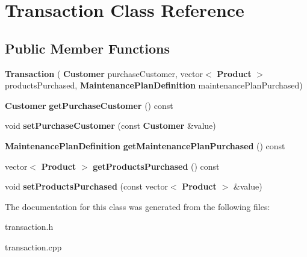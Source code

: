 \section{Transaction Class Reference}
\label{class_transaction}
\subsection*{Public Member Functions}
\begin{DoxyCompactItemize}
\item 
\mbox{\label{class_transaction_a784f940554eb84af1da458e68614224e}} 
{\bfseries Transaction} (\textbf{ Customer} purchase\+Customer, vector$<$ \textbf{ Product} $>$ products\+Purchased, \textbf{ Maintenance\+Plan\+Definition} maintenance\+Plan\+Purchased)
\item 
\mbox{\label{class_transaction_a27fd0df5b0261d28fc5ddeea719734ef}} 
\textbf{ Customer} {\bfseries get\+Purchase\+Customer} () const
\item 
\mbox{\label{class_transaction_ad5ae4d13756cc853128a2d840da63ac8}} 
void {\bfseries set\+Purchase\+Customer} (const \textbf{ Customer} \&value)
\item 
\mbox{\label{class_transaction_adc586f0c013da6c28bee286de93b369b}} 
\textbf{ Maintenance\+Plan\+Definition} {\bfseries get\+Maintenance\+Plan\+Purchased} () const
\item 
\mbox{\label{class_transaction_a79c7fa5de12324fc31d2483dd0898aa9}} 
vector$<$ \textbf{ Product} $>$ {\bfseries get\+Products\+Purchased} () const
\item 
\mbox{\label{class_transaction_a2175ea3e1b921ba19544144f2d949b0a}} 
void {\bfseries set\+Products\+Purchased} (const vector$<$ \textbf{ Product} $>$ \&value)
\end{DoxyCompactItemize}


The documentation for this class was generated from the following files\+:\begin{DoxyCompactItemize}
\item 
transaction.\+h\item 
transaction.\+cpp\end{DoxyCompactItemize}
